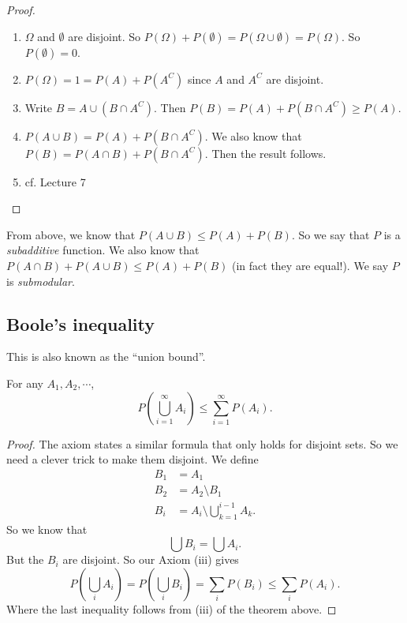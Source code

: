 \documentclass[a4paper]{article}
\begin{document}
\begin{proof}\leavevmode
  \begin{enumerate}
    \item $\Omega$ and $\emptyset$ are disjoint. So $P(\Omega) + P(\emptyset) = P(\Omega \cup \emptyset) = P(\Omega)$. So $P(\emptyset) = 0$.
    \item $P(\Omega) = 1 = P(A) + P(A^C)$ since $A$ and $A^C$ are disjoint.
    \item Write $B = A\cup (B\cap A^C)$. Then $P(B) = P(A) + P(B\cap A^C) \geq P(A)$.
    \item $P(A\cup B) = P(A) + P(B\cap A^C)$. We also know that $P(B) = P(A\cap B) + P(B\cap A^C)$. Then the result follows.
    \item cf. Lecture 7
  \end{enumerate}
\end{proof}

From above, we know that $P(A\cup B) \leq P(A) + P(B)$. So we say that $P$ is a \emph{subadditive} function.  We also know that $P(A\cap B) + P(A \cup B) \leq P(A) + P(B)$ (in fact they are equal!). We say $P$ is \emph{submodular}.

\subsection{Boole's inequality}
This is also known as the ``union bound''.
\begin{thm}
  For any $A_1, A_2, \cdots$,
  \[
    P\left(\bigcup_{i = 1}^\infty A_i\right) \leq \sum_{i =1}^\infty P(A_i).
  \]
\end{thm}

\begin{proof}
  The axiom states a similar formula that only holds for disjoint sets. So we need a clever trick to make them disjoint. We define
  \begin{align*}
    B_1 &= A_1\\
    B_2 &= A_2\setminus B_1\\
    B_i &= A_i\setminus \bigcup_{k = 1}^{i -1 }A_k.
  \end{align*}
  So we know that
  \[
    \bigcup B_i = \bigcup A_i.
  \]
  But the $B_i$ are disjoint. So our Axiom (iii) gives
  \[
    P(\bigcup_i A_i) = P(\bigcup _i B_i) = \sum_i P(B_i) \leq \sum_i P(A_i).
  \]
  Where the last inequality follows from (iii) of the theorem above.
\end{proof}
\end{document}
